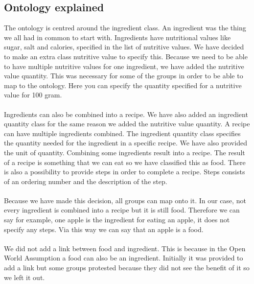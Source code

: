 \subsection{Ontology explained}
The ontology is centred around the ingredient class. An ingredient was the thing we all had in common to start with. Ingredients have nutritional values like sugar, salt and calories, specified in the list of nutritive values. We have decided to make an extra class nutritive value to specify this. Because we need to be able to have multiple nutritive values for one ingredient, we have added the nutritive value quantity. This was necessary for some of the groups in order to be able to map to the ontology. Here you can specify the quantity specified for a nutritive value for 100 gram.
\\ \\
Ingredients can also be combined into a recipe. We have also added an ingredient quantity class for the same reason we added the nutritive value quantity. A recipe can have multiple ingredients combined. The ingredient quantity class specifies the quantity needed for the ingredient in a specific recipe. We have also provided the unit of quantity. Combining some ingredients result into a recipe. The result of a recipe is something that we can eat so we have classified this as food. There is also a possibility to provide steps in order to complete a recipe. Steps consists of an ordering number and the description of the step. 
\\ \\
Because we have made this decision, all groups can map onto it. In our case, not every ingredient is combined into a recipe but it is still food. Therefore we can say for example, one apple is the ingredient for eating an apple, it does not specify any steps. Via this way we can say that an apple is a food.
\\ \\
We did not add a link between food and ingredient. This is because in the Open World Assumption a food can also be an ingredient. Initially it was provided to add a link but some groups protested because they did not see the benefit of it so we left it out. 


